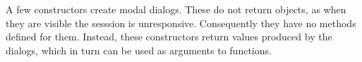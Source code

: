 
A few constructors create modal dialogs. These do not return objects,
as when they are visible the \R\/ sesssion is unresponsive.
Consequently they have no methods defined for them.  Instead, these
constructors return values produced by the dialogs, which in turn can
be used as arguments to functions.


